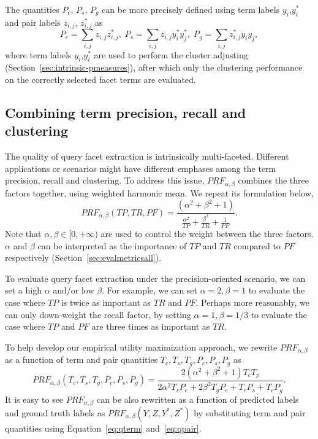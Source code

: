 The quantities $P_c$, $P_s$, $P_g$ can be more precisely defined using term labels $y_i$,$y_i^{*}$ and pair labels $z_{i,j}$, $z_{i,j}^{*}$ as
\begin{equation}
\label{eq:qpair}
 P_c=\sum_{i,j}{z_{i,j}z_{i,j}^{*}}, \; P_s=\sum_{i,j}{z_{i,j}}y_i^*y_j^*, \; P_g=\sum_{i,j}{z_{i,j}^*}y_iy_j,
\end{equation}
where term labels $y_i$,$y_i^{*}$ are used to perform the cluster adjusting (Section~\ref{sec:intrinsic-pmeasures}), after which only the clustering performance on the correctly selected facet terms are evaluated.

\subsection{Combining term precision, recall and clustering}
The quality of query facet extraction is intrinsically multi-faceted. Different applications or scenarios might have different emphases among the term precision, recall and clustering. To address this issue, $P\!R\!F_{\alpha,\beta}$ combines the three factors together, using weighted harmonic mean. We repeat its formulation below,
\begin{equation}
\label{eq:prf2}
 P\!R\!F_{\alpha,\beta}(T\!P, T\!R, P\!F) = \frac{(\alpha^2 + \beta^2 + 1)}{\frac{\alpha^2}{T\!P} + \frac{\beta^2}{T\!R} + \frac{1}{P\!F}}.
\end{equation}
Note that $\alpha,\beta \in [0,+\infty)$ are used to control the weight between the three factors. $\alpha$ and $\beta$ can be interpreted as the importance of $T\!P$ and $T\!R$ compared to $P\!F$ respectively (Section~\ref{sec:evalmetricsall}).

To evaluate query facet extraction under the precision-oriented scenario, we can set a high $\alpha$ and/or low $\beta$. For example, we can set $\alpha\!=\!2,\beta\!=\!1$ to evaluate the case where $T\!P$ is twice as important as $T\!R$ and $P\!F$. Perhaps more reasonably, we can only down-weight the recall factor, by setting $\alpha\!=\!1,\beta\!=\!1/3$ to evaluate the case where $T\!P$ and $P\!F$ are three times as important as $T\!R$.

To help develop our empirical utility maximization approach, we rewrite $P\!R\!F_{\alpha,\beta}$ as a function of term and pair quantities $T_c,T_s,T_g,P_c,P_s,P_g$ as
\begin{equation}
\label{eq:prfc}
 P\!R\!F_{\alpha,\beta}(T_c,T_s,T_g,P_c,P_s,P_g) =\frac{2(\alpha^2 + \beta^2 + 1)T_cT_p}{2\alpha^2T_sP_c+2\beta^2T_gP_c+T_cP_s+T_cP_g}.
\end{equation}
It is easy to see $P\!R\!F_{\alpha,\beta}$ can be also rewritten as a function of predicted labels and ground truth labels as $P\!R\!F_{\alpha,\beta}(Y,Z,Y^{*},Z^{*})$ by substituting term and pair quantities using Equation~\ref{eq:qterm} and~\ref{eq:qpair}.

